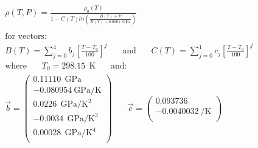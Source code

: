 \begin{equation}
	\begin{split}
		\:&\rho(T,P)=\frac{\rho_{0}(T)}{1-C(T)ln\left ( \frac{B(T)+P}{B(T)+0.0001\:\: \si{\giga\pascal}} \right )}\\\\
		&\text{for vectors}:\\
		&B(T)=\sum_{j=0}^{4}b_{j}\left [  \frac{T-T_{0}}{100}\right ]^j\:\:\:\:\:\:\:\:\text{and}\:\:\:\:\:\:\:\:C(T)=\sum_{j=0}^{1}c_{j}\left [  \frac{T-T_{0}}{100}\right ]^j\\
		& \text{where}\:\:\:\:\:\:\:\:T_{0}= 298.15\:\:\si{\kelvin}\:\:\:\:\:\:\:\:\text{and}:\\
		&\vec{b}=\begin{pmatrix}
			0.11110\:\: \si{\giga\pascal}\\ 
			-0.080954\: \si{\giga\pascal\per\kelvin}\\ 
			0.0226\:\: \si{\giga\pascal\per\kelvin\squared}\\ 
			-0.0034\:\: \si{\giga\pascal\per\kelvin\cubed}\\ 
			0.00028\:\: \si{\giga\pascal\per\kelvin\tothe{4}}\\
		\end{pmatrix} \:\:\:\:\:\:\:\:
		\vec{c}=\begin{pmatrix}
			0.093736 \\ 
			-0.0040032\: \si{\per\kelvin}\\ 
		\end{pmatrix}
	\end{split}
	\label{eqn:CumeneTait}
\end{equation}


